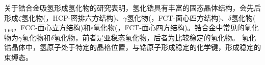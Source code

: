 
关于锆合金吸氢形成氢化物的研究表明，氢化锆具有丰富的固态晶体结构，会先后形成$\zeta$氢化物\textrm{(，\textrm{HCP}-密排六方结构)}、$\gamma$氢化物\textrm{(，\textrm{FCT}-面心四方结构)}、$\delta$氢化物\textrm{($_{1.66}$，\textrm{FCC}-面心立方结构)}和$\epsilon$氢化物\textrm{(，\textrm{FCT}-面心四方结构)}。锆合金中常见的氢化物为$\gamma$氢化物和$\delta$氢化物，前者是亚稳态氢化物，后者为比较稳定的氢化物。%
氢化锆晶体中，氢原子处于特定的晶格位置，与锆原子形成稳定的化学键，形成稳定的束缚态。

